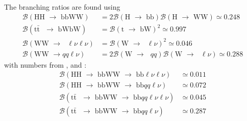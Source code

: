 \documentclass[10pt,a4paper]{article}
\renewcommand{\tt}{$\text{t}\bar{\text{t}}$}
\newcommand{\lnu}{$\ell\nu$}
\begin{document}
The branching ratios are found using
\begin{align*}
    \mathcal{B}(\text{HH $\rightarrow$ bbWW})
        &= 2\mathcal{B}(\text{H $\rightarrow$ bb})
            \mathcal{B}(\text{H $\rightarrow$ WW})
        \simeq 0.248 \\
    \mathcal{B}(\text{\tt\ $\rightarrow$ bWbW})
        &= \mathcal{B}(\text{t $\rightarrow$ bW})^2
        \simeq 0.997 \\
    \mathcal{B}(\text{WW $\rightarrow$ \lnu\lnu})
        &= \mathcal{B}(\text{W $\rightarrow$ \lnu})^2
        \simeq 0.046 \\
    \mathcal{B}(\text{WW $\rightarrow qq$\lnu})
        &= 2\mathcal{B}(\text{W $\rightarrow$ $qq$})
            \mathcal{B}(\text{W $\rightarrow$ \lnu})
        \simeq 0.288
\end{align*}
with numbers from \cite{BR_HH}, \cite{BR_tt} and \cite{BR_W}:
\begin{align*}
    \mathcal{B}(\text{HH $\rightarrow$ bbWW $\rightarrow$ bb\lnu\lnu})
         &\simeq 0.011\\
    \mathcal{B}(\text{HH $\rightarrow$ bbWW $\rightarrow$ bb$qq$\lnu})
         &\simeq 0.072\\
    \mathcal{B}(\text{\tt\ $\rightarrow$ bbWW $\rightarrow$ bb$qq$\lnu\lnu})
         &\simeq 0.045\\
    \mathcal{B}(\text{\tt\ $\rightarrow$ bbWW $\rightarrow$ bb$qq$\lnu})
         &\simeq 0.287
\end{align*}
\end{document}
